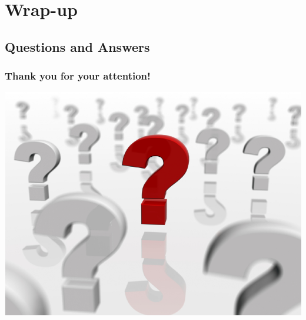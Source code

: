 \documentclass[hyperref={pdfpagelabels=false}]{beamer}
\begin{document}
    \section{Wrap-up}
    \subsection{Questions and Answers}
    \begin{frame}
        \frametitle{Thank you for your attention!}
        \begin{center}
           \includegraphics[scale=0.5]{images/qa.png}
        \end{center} 
    \end{frame}
\end{document}
